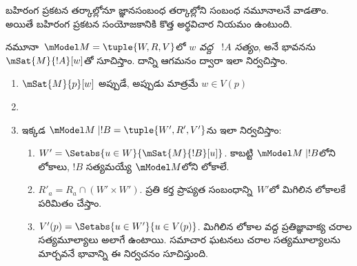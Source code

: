 \documentclass[../../../include/open-logic-section]{subfiles}
\begin{document}


బహిరంగ ప్రకటన తర్కాల్లోనూ జ్ఞానసంబంధ తర్కాల్లోని
సంబంధ నమూనాలనే వాడతాం. అయితే బహిరంగ ప్రకటన
సంయోజకానికి కొత్త అర్థవిచార నియమం ఉంటుంది.

\begin{defn} నమూనా~$\mModel M = \tuple{W, R, V}$లో
  \emph{$w$ వద్ద ~$!A$ సత్యం},
  అనే భావనను $\mSat{M}{!A}[w]$తో సూచిస్తాం.
  దాన్ని ఆగమనం ద్వారా ఇలా నిర్వచిస్తాం.
  \begin{enumerate}
  \item $\mSat{M}{p}[w]$ అప్పుడే, అప్పుడు మాత్రమే $w \in V(p)$
  \item{}
  \item{}


  ఇక్కడ $\mModel M \mid !B = \tuple{W', R', V'}$ను
  ఇలా నిర్వచిస్తాం:
  \begin{enumerate}
    \item $W' = \Setabs{ u \in W}{\mSat{M}{!B}[u]}$. కాబట్టి
      $\mModel M \mid !B$లోని లోకాలు, $!B$ సత్యమయ్యే
      $\mModel M$లోని లోకాలే.
    \item $R'_a = R_a \cap (W' \times W')$. ప్రతి కర్త
      ప్రాప్యత సంబంధాన్ని~$W'$లో మిగిలిన లోకాలకే
      పరిమితం చేస్తాం.
    \item $V'(p) = \Setabs{ u \in W'}{u \in V(p) }$.
      మిగిలిన లోకాల వద్ద ప్రతిజ్ఞావాక్య చరాల సత్యమూల్యాలు
      అలాగే ఉంటాయి. సమాచార ఘటనలు చరాల సత్యమూల్యాలను
      మార్చవనే భావాన్ని ఈ నిర్వచనం సూచిస్తుంది.
  \end{enumerate}

  \end{enumerate}
\end{defn}
\end{document}
